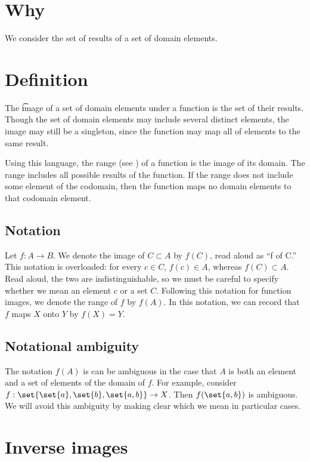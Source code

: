
\section*{Why}

We consider the set of results of a set of domain elements.

\section*{Definition}

The \t{image} of a set of domain elements under a function is the set of their results.
Though the set of domain elements may include several distinct elements, the image may still be a singleton, since the function may map all of elements to the same result.

Using this language, the range (see ) of a function is the image of its domain.
The range includes all possible results of the function.
If the range does not include some element of the codomain, then the function maps no domain elements to that codomain element.

\subsection*{Notation}

Let $f: A \to B$.
We denote the image of $C \subset A$ by $f(C)$, read aloud as ``f of C.''
This notation is overloaded: for every $c \in C$, $f(c) \in A$, whereas $f(C) \subset A$.
Read aloud, the two are indistinguishable, so we must be careful to specify whether we mean an element $c$ or a set $C$.
Following this notation for function images, we denote the range of $f$ by $f(A)$.
In this notation, we can record that $f$ maps $X$ onto $Y$ by $f(X) = Y$.

\subsection*{Notational ambiguity}

The notation $f(A)$ is can be ambiguous in the case that $A$ is both an element and a set of elements of the domain of $f$.
For example, consider $f: \set{\set{a}, \set{b}, \set{a, b}} \to X$.
Then $f(\set{a, b})$ is ambiguous.
We will avoid this ambiguity by making clear which we mean in particular cases.

\section*{Inverse images}

